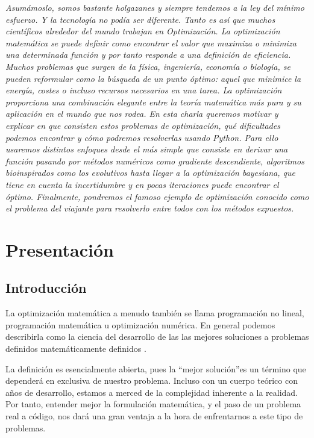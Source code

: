 \documentclass[runningheads]{llncs}
\begin{document}
	
	\textit{ Asumámoslo, somos bastante holgazanes y siempre tendemos a la ley del mínimo esfuerzo. Y la tecnología no podía ser diferente. Tanto es así que muchos científicos alrededor del mundo trabajan en Optimización. La optimización matemática se puede definir como encontrar el valor que maximiza o minimiza una determinada función y por tanto responde a una definición de eficiencia. Muchos problemas que surgen de la física, ingeniería, economía o biología, se pueden reformular como la búsqueda de un punto óptimo: aquel que minimice la energía, costes o incluso recursos necesarios en una tarea. La optimización proporciona una combinación elegante entre la teoría matemática más pura y su aplicación en el mundo que nos rodea. En esta charla queremos motivar y explicar en que consisten estos problemas de optimización, qué dificultades podemos encontrar y cómo podremos resolverlas usando Python. Para ello usaremos distintos enfoques desde el más simple que consiste en derivar una función pasando por métodos numéricos como gradiente descendiente, algoritmos bioinspirados como los evolutivos hasta llegar a la optimización bayesiana, que tiene en cuenta la incertidumbre y en pocas iteraciones puede encontrar el óptimo. Finalmente, pondremos el famoso ejemplo de optimización conocido como el problema del viajante para resolverlo entre todos con los métodos expuestos.}

\section{Presentaci\'on}
\subsection{Introducción}
La optimización matemática a menudo también se llama programación no lineal, programación matemática u optimización numérica. En general podemos describirla como la ciencia del desarrollo de las  las mejores soluciones a problemas definidos matemáticamente definidos \cite{snyman2005practical}.

La definición es esencialmente abierta, pues la \textquotedblleft mejor solución\textquotedblright es un término que dependerá en exclusiva de nuestro problema. Incluso con un cuerpo teórico con años de desarrollo, estamos a merced de la complejidad inherente a la realidad. Por tanto, entender mejor la formulación matemática, y el paso de un problema real a código, nos dará una gran ventaja a la hora de enfrentarnos a este tipo de problemas.
\end{document}
